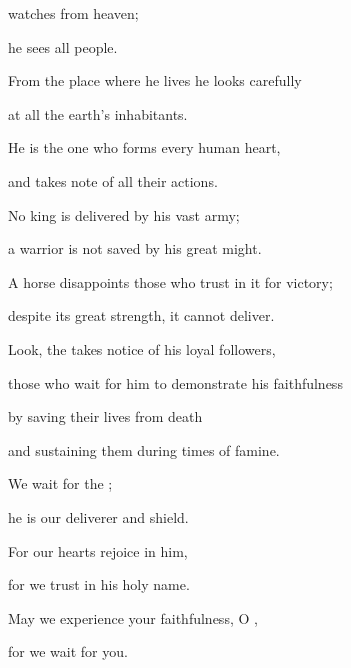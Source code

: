 {watches
from heaven;
\par }{\Q he sees
all
people.
\par }{\Q {}From the place
where he lives
he looks
carefully
\par }{\Q at all
the earth’s
inhabitants.
\par }{\Q {}He is the one who forms
every human heart,
\par }{\Q and takes note
of all
their actions.
\par }{\Q {}No
king
is delivered
by
his vast
army;
\par }{\Q a warrior
is not
saved
by his great
might.
\par }{\Q {}A horse
disappoints
those who trust in it for victory;
\par }{\Q despite its great
strength,
it cannot
deliver.
\par }{\Q {}Look,
the {}
takes notice
of his loyal followers,
\par }{\Q those who wait
for him to demonstrate his faithfulness
\par }{\Q {}by saving
their lives
from death
\par }{\Q and sustaining
them during times of famine.
\par }{\Q {}We wait
for the
{};
\par }{\Q he is
our deliverer
and shield.
\par }{\Q {}For
our hearts
rejoice
in him,
\par }{\Q for
we trust
in his holy
name.
\par }{\Q {}May
we experience your faithfulness,
O
{},

\par }{\Q for we wait for you.


}
